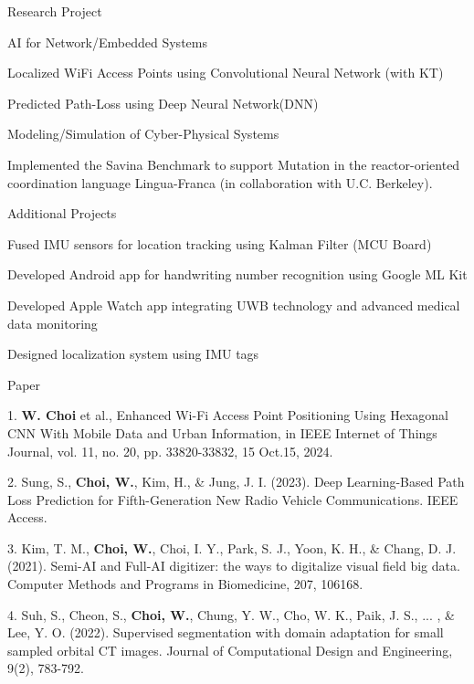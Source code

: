 \documentclass[
	11pt, %
]{resume} %
\begin{document}
\begin{rSection}{Research Project}
	\begin{rSubsection}{AI for Network/Embedded Systems}{}{}{}
		\item Localized WiFi Access Points using Convolutional Neural Network (with KT)
		\item Predicted Path-Loss using Deep Neural Network(DNN)
	\end{rSubsection}

	\begin{rSubsection}{Modeling/Simulation of Cyber-Physical Systems}{}{}{}
		\item Implemented the Savina Benchmark to support Mutation in the reactor-oriented coordination language Lingua-Franca (in collaboration with U.C. Berkeley).
	\end{rSubsection}

	
	\begin{rSubsection}{Additional Projects}{}{}{}
		\item Fused IMU sensors for location tracking using Kalman Filter (MCU Board)
		\item Developed Android app for handwriting number recognition using Google ML Kit
		\item Developed Apple Watch app integrating UWB technology and advanced medical data monitoring
		\item Designed localization system using IMU tags
	\end{rSubsection}
\end{rSection}



\begin{rSection}{Paper}

	1. \textbf{W. Choi} et al., Enhanced Wi-Fi Access Point Positioning Using Hexagonal CNN With Mobile Data and Urban Information, in IEEE Internet of Things Journal, vol. 11, no. 20, pp. 33820-33832, 15 Oct.15, 2024.

	2. Sung, S., \textbf{Choi, W.}, Kim, H., \& Jung, J. I. (2023). Deep Learning-Based Path Loss Prediction for Fifth-Generation New Radio Vehicle Communications. IEEE Access.
	
	3. Kim, T. M., \textbf{Choi, W.}, Choi, I. Y., Park, S. J., Yoon, K. H., \& Chang, D. J. (2021). Semi-AI and Full-AI digitizer: the ways to digitalize visual field big data. Computer Methods and Programs in Biomedicine, 207, 106168.

	4. Suh, S., Cheon, S., \textbf{Choi, W.}, Chung, Y. W., Cho, W. K., Paik, J. S., ... , \& Lee, Y. O. (2022). Supervised segmentation with domain adaptation for small sampled orbital CT images. Journal of Computational Design and Engineering, 9(2), 783-792.


\end{rSection}
\end{document}
